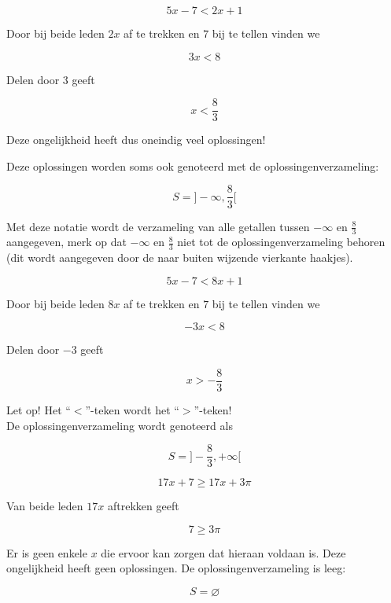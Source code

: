 \begin{voorbeeld}
	

\[ 5x-7 < 2x+1 \]

Door bij beide leden $2x$ af te trekken en $7$ bij te tellen vinden we

\[ 3x<8 \]

Delen door $3$ geeft

\[ x< \frac{8}{3} \]

Deze ongelijkheid heeft dus oneindig veel oplossingen!

Deze oplossingen worden soms ook genoteerd met de oplossingenverzameling:

\[ S=] -\infty, \frac{8}{3} [ \]

Met deze notatie wordt de verzameling van alle getallen tussen $-\infty$ en $\frac{8}{3}$ aangegeven, merk op dat $-\infty$ en $\frac{8}{3}$ niet tot de oplossingenverzameling behoren (dit wordt aangegeven door de naar buiten wijzende vierkante haakjes).

\end{voorbeeld}
\begin{voorbeeld}
	

\[ 5x-7 < 8x+1 \]

Door bij beide leden $8x$ af te trekken en $7$ bij te tellen vinden we

\[ -3x<8 \]

Delen door $-3$ geeft

\[ x> -\frac{8}{3} \]

Let op! Het ``$<$''-teken wordt het ``$>$''-teken!\\

De oplossingenverzameling wordt genoteerd als

\[ S=]-\frac{8}{3}, +\infty [ \]

\end{voorbeeld}
\begin{voorbeeld}
	

\[ 17x+7 \geq 17x+3\pi \]

Van beide leden $17x$ aftrekken geeft

\[ 7 \geq 3 \pi \]

Er is geen enkele $x$ die ervoor kan zorgen dat hieraan voldaan is. Deze ongelijkheid heeft geen oplossingen. De oplossingenverzameling is leeg:

\[ S=\varnothing \]


\end{voorbeeld}
